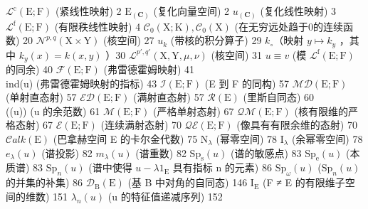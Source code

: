 
\(\mathcal{L}^{\mathrm{c}}(\mathrm{E};\mathrm{F})\) (紧线性映射) 2 \(\mathrm{E}_{(\mathbf{C})}\) (复化向量空间) 2 \(u_{(\mathbf{C})}\) (复化线性映射) 3 \(\mathcal{L}^{\mathrm{f}}(\mathrm{E};\mathrm{F})\) (有限秩线性映射) 4 \(\mathcal{C}_0(\mathrm{X};\mathrm{K}), \mathcal{C}_0(\mathrm{X})\) (在无穷远处趋于0的连续函数) 20 \(\mathcal{N}^{p,q}(\mathrm{X} \times \mathrm{Y})\) (核空间) 27 \(u_k\) (带核的积分算子) 29 \(k_\circ\)（映射 \(y \mapsto k_y\) ，其中 \(k_y(x) = k(x,y)\) ）30 \(\mathcal{L}^{p',q'}(\mathrm{X},\mathrm{Y},\mu,\nu)\) (核空间) 31 \(u \equiv v\) (模 \(\mathcal{L}^{\mathrm{f}}(\mathrm{E};\mathrm{F})\) 的同余) 40 \(\mathcal{F}(\mathrm{E};\mathrm{F})\) (弗雷德霍姆映射) 41\\
ind(u) (弗雷德霍姆映射的指标) 43 \(\mathcal{I}(\mathrm{E};\mathrm{F})\) (E 到 F 的同构) 57 \(\mathcal{M}\mathcal{D}(\mathrm{E};\mathrm{F})\) (单射直态射) 57 \(\mathcal{E}\mathcal{D}(\mathrm{E};\mathrm{F})\) (满射直态射) 57 \(\mathcal{R}(\mathrm{E})\) (里斯自同态) 60\\
((u)) (u 的余范数) 61 \(\mathcal{M}(\mathrm{E};\mathrm{F})\) (严格单射态射) 67 \(\mathcal{Q}\mathcal{M}(\mathrm{E};\mathrm{F})\) (核有限维的严格态射) 67 \(\mathcal{E}(\mathrm{E};\mathrm{F})\) (连续满射态射) 70 \(\mathcal{Q}\mathcal{E}(\mathrm{E};\mathrm{F})\) (像具有有限余维的态射) 70 \(\mathcal{C}alk(\mathrm{E})\) (巴拿赫空间 E 的卡尔金代数) 75 \(\mathrm{N}_{\lambda}\) (幂零空间) 78 \(\mathrm{I}_{\lambda}\) (余幂零空间) 78 \(e_{\lambda}(u)\) (谱投影) 82 \(m_{\lambda}(u)\) (谱重数) 82 \(\mathrm{Sp}_{\mathrm{s}}(u)\) (谱的敏感点) 83 \(\mathrm{Sp}_{\mathrm{e}}(u)\) (本质谱) 83 \(\mathrm{Sp}_{n}(u)\) (谱中使得 \(u - \lambda 1_{\mathrm{E}}\) 具有指标 n 的元素) 86 \(\mathrm{Sp}_{\omega}(u)\) (\(\mathrm{Sp}_{n}(u)\) 的并集的补集) 86 \(\mathcal{D}_{\mathrm{B}}(\mathrm{E})\) (基 B 中对角的自同态) 146 \(\mathrm{I}_{\mathrm{E}}\) (F ≠ E 的有限维子空间的维数) 151 \(\lambda_n(u)\) (u 的特征值递减序列) 152

